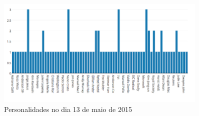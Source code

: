 \begin{figure}[htbp]
  \centering
    \includegraphics[width=0.9\textwidth]{images/day_two.png} %
	\caption{Personalidades no dia 13 de maio de 2015}
\end{figure}

